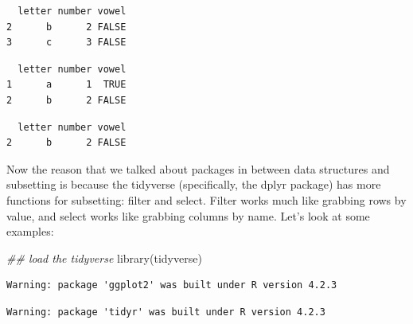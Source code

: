 \documentclass[
  letterpaper,
  DIV=11,
  numbers=noendperiod]{scrreprt}
\newenvironment{Shaded}{\begin{snugshade}}{\end{snugshade}}
\newcommand{\ConstantTok}[1]{\textcolor[rgb]{0.56,0.35,0.01}{#1}}
\newcommand{\DecValTok}[1]{\textcolor[rgb]{0.68,0.00,0.00}{#1}}
\newcommand{\DocumentationTok}[1]{\textcolor[rgb]{0.37,0.37,0.37}{\textit{#1}}}
\newcommand{\FunctionTok}[1]{\textcolor[rgb]{0.28,0.35,0.67}{#1}}
\newcommand{\NormalTok}[1]{\textcolor[rgb]{0.00,0.23,0.31}{#1}}
\newcommand{\SpecialCharTok}[1]{\textcolor[rgb]{0.37,0.37,0.37}{#1}}
\begin{document}
\begin{verbatim}
  letter number vowel
2      b      2 FALSE
3      c      3 FALSE
\end{verbatim}

\begin{Shaded}
\end{Shaded}

\begin{verbatim}
  letter number vowel
1      a      1  TRUE
2      b      2 FALSE
\end{verbatim}

\begin{Shaded}
\end{Shaded}

\begin{verbatim}
  letter number vowel
2      b      2 FALSE
\end{verbatim}

Now the reason that we talked about packages in between data structures
and subsetting is because the tidyverse (specifically, the dplyr
package) has more functions for subsetting: filter and select. Filter
works much like grabbing rows by value, and select works like grabbing
columns by name. Let's look at some examples:

\begin{Shaded}
\begin{Highlighting}[]
\DocumentationTok{\#\# load the tidyverse}
\FunctionTok{library}\NormalTok{(tidyverse)}
\end{Highlighting}
\end{Shaded}

\begin{verbatim}
Warning: package 'ggplot2' was built under R version 4.2.3
\end{verbatim}

\begin{verbatim}
Warning: package 'tidyr' was built under R version 4.2.3
\end{verbatim}
\end{document}
